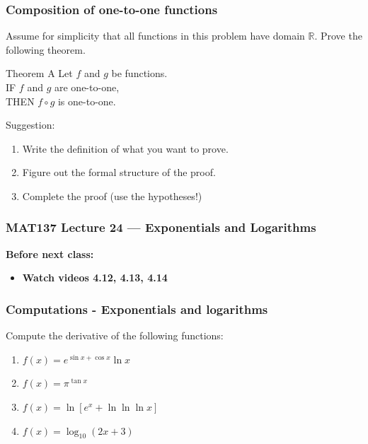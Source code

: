 \documentclass[14pt]{beamer}
\newcommand {\DS} [1] {${\displaystyle #1}$}
\newcommand {\R}{\mathbb{R}}
\begin{document}
\begin{frame}[t]
\frametitle{Composition of one-to-one functions}


Assume for simplicity that all functions in this problem have domain $\R$.  Prove the following theorem.

\vfill


\begin{block}{Theorem A}
Let $f$ and $g$ be functions. \\
IF $f$ and $g$ are one-to-one, \\
THEN $f \circ g$ is one-to-one.
\end{block}

\vfill

Suggestion:
	\begin{enumerate}
		\item Write the definition of what you want to prove.

		\item  Figure out the formal structure of the proof.

		\item   Complete the proof (use the hypotheses!)
	\end{enumerate}

\end{frame}













\begin{frame}
	\frametitle{MAT137 Lecture 24 --- Exponentials and Logarithms}

	\vfill
	{\bf Before next class:}
		\begin{itemize} \normalsize
			\item {\bf Watch videos  4.12, 4.13, 4.14}
		\end{itemize}
\end{frame}


\begin{frame}[t]
\frametitle{Computations - Exponentials and logarithms}



Compute the derivative of the following functions:

\begin{enumerate}
	\item  \DS{f(x) = e^{\sin x + \cos x} \ln x}
\vfill
	\item  \DS{f(x) = \pi^{\tan x}}
\vfill
	\item  \DS{f(x) = \ln \left[ e^x + \ln  \ln  \ln x  \right]}
\vfill
	\item \DS{f(x) = \log_{10} \left( 2x + 3 \right)}
\vfill
\end{enumerate}


\end{frame}
\end{document}
